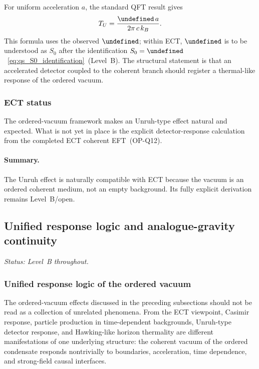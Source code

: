 \documentclass[11pt,a4paper]{article}
\let\hbar\undefined
\numberwithin{equation}{section}
\begin{document}
For uniform acceleration $a$, the standard QFT result gives
\begin{equation}
  \label{eq:qs_unruh_temp}
  T_U
  =
  \frac{\hbar\,a}{2\pi\,c\,k_B}.
\end{equation}
This formula uses the observed $\hbar$; within ECT, $\hbar$ is to be
understood as $S_0$ after the identification
$S_0=\hbar$~\eqref{eq:qs_S0_identification}~(Level~B).
The structural statement is that an accelerated detector coupled to the
coherent branch should register a thermal-like response of the ordered
vacuum.

\subsubsection*{ECT status}

The ordered-vacuum framework makes an Unruh-type effect natural and
expected.
What is not yet in place is the explicit detector-response calculation
from the completed ECT coherent EFT~(OP-Q12).

\paragraph{Summary.}
The Unruh effect is naturally compatible with ECT because the vacuum is
an ordered coherent medium, not an empty background.
Its fully explicit derivation remains Level~B/open.

\subsection{Unified response logic and analogue-gravity continuity}
\label{sec:qs_vacuum_unified}

\textit{Status: Level~B throughout.}

\medskip

\subsubsection*{Unified response logic of the ordered vacuum}

The ordered-vacuum effects discussed in the preceding subsections
should not be read as a collection of unrelated phenomena.
From the ECT viewpoint, Casimir response, particle production in
time-dependent backgrounds, Unruh-type detector response, and
Hawking-like horizon thermality are different manifestations of one
underlying structure: the coherent vacuum of the ordered condensate
responds nontrivially to boundaries, acceleration, time dependence,
and strong-field causal interfaces.
\end{document}
